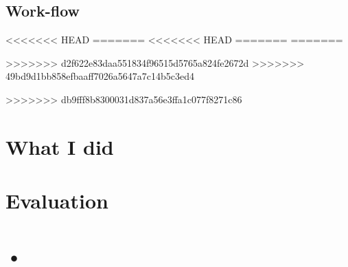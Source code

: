 \documentclass[11pt,a4paper]{report}
\begin{document}
\subsection{Work-flow}
<<<<<<< HEAD
=======
<<<<<<< HEAD
=======
=======

>>>>>>> d2f622e83daa551834f96515d5765a824fe2672d
>>>>>>> 49bd9d1bb858efbaaff7026a5647a7c14b5c3ed4

>>>>>>> db9fff8b8300031d837a56e3ffa1c077f8271c86

\section{What I did}



\section{Evaluation}



\section{•}
\end{document}
